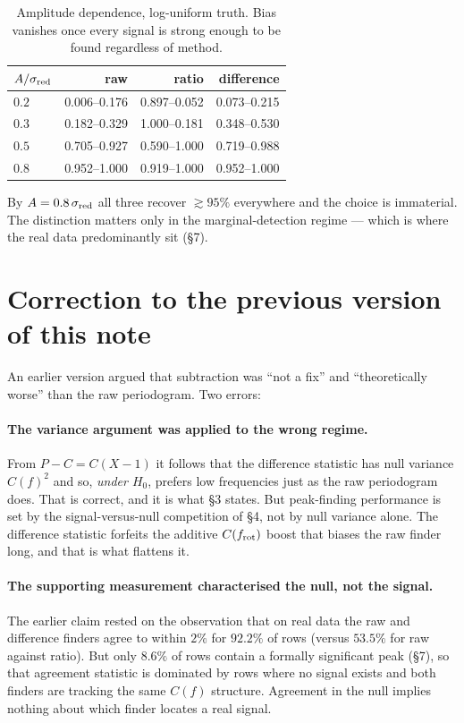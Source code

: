 \documentclass[11pt]{article}
\begin{document}
\begin{table}[htbp]
\centering
\caption{Amplitude dependence, log-uniform truth. Bias vanishes once every signal is
strong enough to be found regardless of method.}
\begin{tabular}{lrrr}
\toprule
$A/\sigma_{\rm red}$ & raw & ratio & difference \\
\midrule
$0.2$ & 0.006--0.176 & 0.897--0.052 & 0.073--0.215 \\
$0.3$ & 0.182--0.329 & 1.000--0.181 & 0.348--0.530 \\
$0.5$ & 0.705--0.927 & 0.590--1.000 & 0.719--0.988 \\
$0.8$ & 0.952--1.000 & 0.919--1.000 & 0.952--1.000 \\
\bottomrule
\end{tabular}
\end{table}

By $A = 0.8\,\sigma_{\rm red}$ all three recover $\gtrsim95\%$ everywhere and the choice
is immaterial. The distinction matters only in the marginal-detection regime --- which is
where the real data predominantly sit (\S7).

\section{Correction to the previous version of this note}

An earlier version argued that subtraction was ``not a fix'' and ``theoretically worse''
than the raw periodogram. Two errors:

\paragraph{The variance argument was applied to the wrong regime.}
From $P-C = C(X-1)$ it follows that the difference statistic has null variance $C(f)^2$
and so, \emph{under $H_0$}, prefers low frequencies just as the raw periodogram does. That
is correct, and it is what \S3 states. But peak-finding performance is set by the
signal-versus-null competition of \S4, not by null variance alone. The difference
statistic forfeits the additive $C(f_{\rm rot})$ boost that biases the raw finder long,
and that is what flattens it.

\paragraph{The supporting measurement characterised the null, not the signal.}
The earlier claim rested on the observation that on real data the raw and difference
finders agree to within $2\%$ for $92.2\%$ of rows (versus $53.5\%$ for raw against
ratio). But only $8.6\%$ of rows contain a formally significant peak (\S7), so that
agreement statistic is dominated by rows where no signal exists and both finders are
tracking the same $C(f)$ structure. Agreement in the null implies nothing about which
finder locates a real signal.
\end{document}
